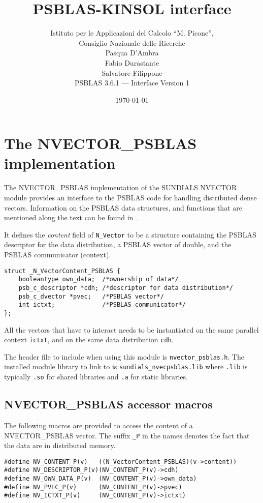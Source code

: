 \documentclass[twoside,a4paper]{refart}
\title{PSBLAS-KINSOL interface}
\author{Istituto per le Applicazioni del Calcolo ``M. Picone'',\\
	Consiglio Nazionale delle Ricerche \\
	Pasqua D'Ambra \\
	Fabio Durastante \\
	Salvatore Filippone \\
	PSBLAS 3.6.1 --- Interface Version 1}
\date{\today}
\begin{document}
	\maketitle
	
	\tableofcontents
	\newpage
	
	\section{The NVECTOR\_PSBLAS implementation}
	The NVECTOR\_PSBLAS implementation of the SUNDIALS NVECTOR module provides an interface to the PSBLAS code for handling distributed dense vectors. Information on the PSBLAS data structures, and functions that are mentioned along the text can be found in~\cite{psblasguide}.
	
	It defines the \emph{content} field of \texttt{N\_Vector} to be a structure containing the PSBLAS descriptor for the data distribution, a PSBLAS vector of double, and the PSBLAS communicator (context).
	
\begin{lstlisting}[style=CStyle]
struct _N_VectorContent_PSBLAS {
	booleantype own_data;  /*ownership of data*/
	psb_c_descriptor *cdh; /*descriptor for data distribution*/
	psb_c_dvector *pvec;   /*PSBLAS vector*/
	int ictxt;             /*PSBLAS communicator*/
};
\end{lstlisting}
	
	\attention All the vectors that have to interact needs to be instantiated on the same parallel context \lstinline[style=CStyle]|ictxt|, and on the same data distribution \lstinline[style=CStyle]|cdh|.
	
	
	The header file to include when using this module is \texttt{nvector\_psblas.h}. The installed module library to link to is \texttt{sundials\_nvecpsblas.lib} where \texttt{.lib} is typically \texttt{.so} for shared libraries and \texttt{.a} for static libraries.
	
	\subsection{NVECTOR\_PSBLAS accessor macros}
	
	The following macros are provided to access the content of a NVECTOR\_PSBLAS vector. The suffix \texttt{\_P} in the names denotes the fact that the data are in distributed memory.

\begin{lstlisting}[style=CStyle]
#define NV_CONTENT_P(v)   ((N_VectorContent_PSBLAS)(v->content))
#define NV_DESCRIPTOR_P(v)(NV_CONTENT_P(v)->cdh)
#define NV_OWN_DATA_P(v)  (NV_CONTENT_P(v)->own_data)
#define NV_PVEC_P(v)      (NV_CONTENT_P(v)->pvec)
#define NV_ICTXT_P(v)     (NV_CONTENT_P(v)->ictxt)
\end{lstlisting}
\end{document}
